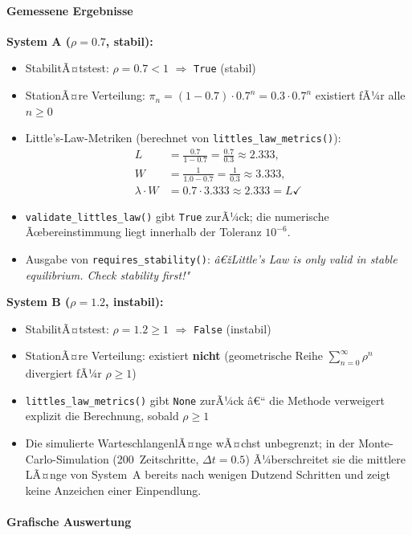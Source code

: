﻿\documentclass[a4paper,12pt]{scrreprt}
\theoremstyle{definition}
\begin{document}
\paragraph{Gemessene Ergebnisse}

\textbf{System A ($\rho = 0.7$, stabil):}
\begin{itemize}
	\item StabilitÃ¤tstest: $\rho = 0.7 < 1$ \quad$\Rightarrow$\quad
	\texttt{True} (stabil)
	\item StationÃ¤re Verteilung: $\pi_n = (1-0.7)\cdot 0.7^n =
	0.3 \cdot 0.7^n$ existiert fÃ¼r alle $n \geq 0$
	\item Little's-Law-Metriken (berechnet von
	\texttt{littles\_law\_metrics()}):
	\begin{align*}
		L &= \frac{0.7}{1-0.7} = \frac{0.7}{0.3} \approx 2.333, \\
		W &= \frac{1}{1.0 - 0.7} = \frac{1}{0.3} \approx 3.333, \\
		\lambda \cdot W &= 0.7 \cdot 3.333 \approx 2.333 = L \checkmark
	\end{align*}
	\item \texttt{validate\_littles\_law()} gibt \texttt{True} zurÃ¼ck;
	die numerische Ãœbereinstimmung liegt innerhalb der Toleranz
	$10^{-6}$.
	\item Ausgabe von \texttt{requires\_stability()}: \emph{â€žLittle's
		Law is only valid in stable equilibrium.  Check stability
		first!"}
\end{itemize}

\textbf{System B ($\rho = 1.2$, instabil):}
\begin{itemize}
	\item StabilitÃ¤tstest: $\rho = 1.2 \geq 1$ \quad$\Rightarrow$\quad
	\texttt{False} (instabil)
	\item StationÃ¤re Verteilung: existiert \textbf{nicht} (geometrische
	Reihe $\sum_{n=0}^\infty \rho^n$ divergiert fÃ¼r $\rho \geq 1$)
	\item \texttt{littles\_law\_metrics()} gibt \texttt{None} zurÃ¼ck â€“
	die Methode verweigert explizit die Berechnung, sobald
	$\rho \geq 1$
	\item Die simulierte WarteschlangenlÃ¤nge wÃ¤chst unbegrenzt; in
	der Monte-Carlo-Simulation (200~Zeitschritte, $\Delta t = 0.5$)
	Ã¼berschreitet sie die mittlere LÃ¤nge von System~A bereits
	nach wenigen Dutzend Schritten und zeigt keine Anzeichen
	einer Einpendlung.
\end{itemize}

\paragraph{Grafische Auswertung}
\end{document}
